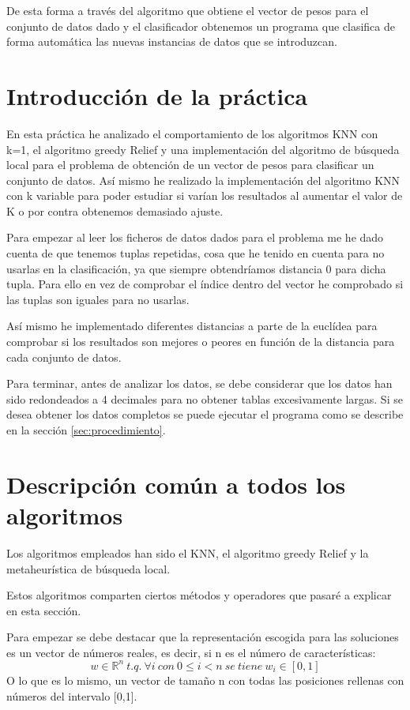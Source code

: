 \documentclass[12pt,a4paper]{article}
\begin{document}
	De esta forma a través del algoritmo que obtiene el vector de pesos para el conjunto de datos dado y el clasificador obtenemos un programa que clasifica de forma automática las nuevas instancias de datos que se introduzcan.

	\newpage

	\section{Introducción de la práctica}
	\label{sec:introPractica}

	En esta práctica he analizado el comportamiento de los algoritmos KNN con k=1, el algoritmo greedy Relief y una implementación del algoritmo de búsqueda local para el problema de obtención de un vector de pesos para clasificar un conjunto de datos. Así mismo he realizado la implementación del algoritmo KNN con k variable para poder estudiar si varían los resultados al aumentar el valor de K o por contra obtenemos demasiado ajuste.

	Para empezar al leer los ficheros de datos dados para el problema me he dado cuenta de que tenemos tuplas repetidas, cosa que he tenido en cuenta para no usarlas en la clasificación, ya que siempre obtendríamos distancia 0 para dicha tupla. Para ello en vez de comprobar el índice dentro del vector he comprobado si las tuplas son iguales para no usarlas.

	Así mismo he implementado diferentes distancias a parte de la euclídea para comprobar si los resultados son mejores o peores en función de la distancia para cada conjunto de datos.

	Para terminar, antes de analizar los datos, se debe considerar que los datos han sido redondeados a 4 decimales para no obtener tablas excesivamente largas. Si se desea obtener los datos completos se puede ejecutar el programa como se describe en la sección \hyperref[sec:procedimiento]{\ref{sec:procedimiento}}.


	\section{Descripción común a todos los algoritmos}
	Los algoritmos empleados han sido el KNN, el algoritmo greedy Relief y la metaheurística de búsqueda local.

	Estos algoritmos comparten ciertos métodos y operadores que pasaré a explicar en esta sección.

	Para empezar se debe destacar que la representación escogida para las soluciones es un vector de números reales, es decir, si n es el número de características:
	$$w\in \mathbb{R}^n \ t.q. \ \forall i \ con \ 0\leq i < n \ se \ tiene \ w_i \in [0,1]$$
	O lo que es lo mismo, un vector de tamaño n con todas las posiciones rellenas con números del intervalo [0,1].
\end{document}
